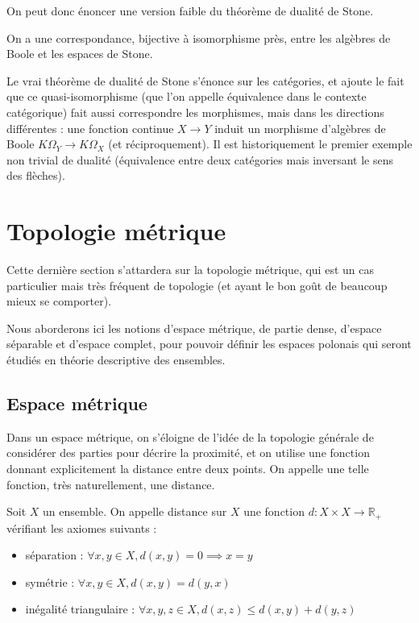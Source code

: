 On peut donc énoncer une version faible du théorème de dualité de Stone.

\begin{theorem}
  On a une correspondance, bijective à isomorphisme près, entre les algèbres
  de Boole et les espaces de Stone.
\end{theorem}

Le vrai théorème de dualité de Stone s'énonce sur les catégories, et ajoute le
fait que ce quasi-isomorphisme (que l'on appelle équivalence dans le contexte
catégorique) fait aussi correspondre les morphismes, mais dans les directions
différentes : une fonction continue $X \to Y$ induit un morphisme d'algèbres de
Boole $K\Omega_Y\to K\Omega_X$ (et réciproquement). Il est historiquement le
premier exemple non trivial de dualité (équivalence entre deux catégories mais
inversant le sens des flèches).

\section{Topologie métrique}

Cette dernière section s'attardera sur la topologie métrique, qui est un cas
particulier mais très fréquent de topologie (et ayant le bon goût de beaucoup
mieux se comporter).

Nous aborderons ici les notions d'espace métrique, de partie dense, d'espace
séparable et d'espace complet, pour pouvoir définir les espaces polonais qui
seront étudiés en théorie descriptive des ensembles.

\subsection{Espace métrique}

Dans un espace métrique, on s'éloigne de l'idée de la topologie générale de
considérer des parties pour décrire la proximité, et on utilise une fonction
donnant explicitement la distance entre deux points. On appelle une telle
fonction, très naturellement, une distance.

\begin{definition}[Distance]
  Soit $X$ un ensemble. On appelle distance sur $X$ une fonction
  $d : X \times X \to \mathbb R_+$ vérifiant les axiomes suivants :
  \begin{itemize}
  \item séparation : $\forall x,y\in X, d(x,y) =0 \implies x = y$
  \item symétrie : $\forall x,y\in X, d(x,y)=d(y,x)$
  \item inégalité triangulaire :
    $\forall x,y,z\in X, d(x,z) \leq d(x,y)+d(y,z)$
  \end{itemize}
\end{definition}


